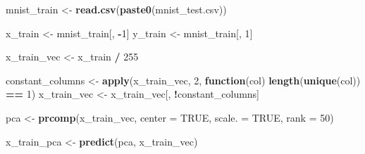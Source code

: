 \documentclass[
  ignorenonframetext,
]{beamer}
\newenvironment{Shaded}{\begin{snugshade}}{\end{snugshade}}
\newcommand{\AttributeTok}[1]{\textcolor[rgb]{0.13,0.29,0.53}{#1}}
\newcommand{\ConstantTok}[1]{\textcolor[rgb]{0.56,0.35,0.01}{#1}}
\newcommand{\ControlFlowTok}[1]{\textcolor[rgb]{0.13,0.29,0.53}{\textbf{#1}}}
\newcommand{\DecValTok}[1]{\textcolor[rgb]{0.00,0.00,0.81}{#1}}
\newcommand{\FunctionTok}[1]{\textcolor[rgb]{0.13,0.29,0.53}{\textbf{#1}}}
\newcommand{\NormalTok}[1]{#1}
\newcommand{\OtherTok}[1]{\textcolor[rgb]{0.56,0.35,0.01}{#1}}
\newcommand{\SpecialCharTok}[1]{\textcolor[rgb]{0.81,0.36,0.00}{\textbf{#1}}}
\newcommand{\StringTok}[1]{\textcolor[rgb]{0.31,0.60,0.02}{#1}}
\begin{document}
\begin{frame}[fragile]{}
\protect\hypertarget{section-3}{}
\begin{Shaded}
\begin{Highlighting}[]
\NormalTok{mnist\_train }\OtherTok{\textless{}{-}} \FunctionTok{read.csv}\NormalTok{(}\FunctionTok{paste0}\NormalTok{(}\StringTok{\textquotesingle{}mnist\_test.csv\textquotesingle{}}\NormalTok{))}

\NormalTok{x\_train }\OtherTok{\textless{}{-}}\NormalTok{ mnist\_train[, }\SpecialCharTok{{-}}\DecValTok{1}\NormalTok{]}
\NormalTok{y\_train }\OtherTok{\textless{}{-}}\NormalTok{ mnist\_train[, }\DecValTok{1}\NormalTok{]}

\NormalTok{x\_train\_vec }\OtherTok{\textless{}{-}}\NormalTok{ x\_train }\SpecialCharTok{/} \DecValTok{255}

\NormalTok{constant\_columns }\OtherTok{\textless{}{-}} \FunctionTok{apply}\NormalTok{(x\_train\_vec, }\DecValTok{2}\NormalTok{, }\ControlFlowTok{function}\NormalTok{(col) }\FunctionTok{length}\NormalTok{(}\FunctionTok{unique}\NormalTok{(col)) }\SpecialCharTok{==} \DecValTok{1}\NormalTok{)}
\NormalTok{x\_train\_vec }\OtherTok{\textless{}{-}}\NormalTok{ x\_train\_vec[, }\SpecialCharTok{!}\NormalTok{constant\_columns]}

\NormalTok{pca }\OtherTok{\textless{}{-}} \FunctionTok{prcomp}\NormalTok{(x\_train\_vec, }\AttributeTok{center =} \ConstantTok{TRUE}\NormalTok{, }\AttributeTok{scale. =} \ConstantTok{TRUE}\NormalTok{, }\AttributeTok{rank =} \DecValTok{50}\NormalTok{)}

\NormalTok{x\_train\_pca }\OtherTok{\textless{}{-}} \FunctionTok{predict}\NormalTok{(pca, x\_train\_vec)}
\end{Highlighting}
\end{Shaded}
\end{frame}

\begin{frame}[fragile]{}
\protect\hypertarget{section-4}{}
\begin{Shaded}
\end{Shaded}
\end{frame}
\end{document}
